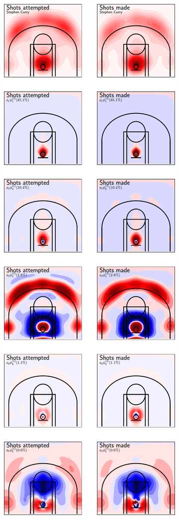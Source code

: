 \begin{figure}
    \centering
    \begin{subfigure}[b]{0.45\textwidth}
        \centering
        \includegraphics[width=\textwidth]{figures/curry_decomposition.pdf}

\end{subfigure}
\end{figure}
